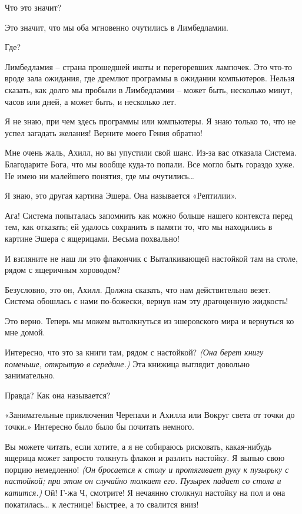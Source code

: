 \documentclass[../main.tex]{subfiles}
\begin{document}
\begin{Dialogue}
\begin{sublevel}
\begin{sublevel}
 Что это значит?

 Это значит, что мы оба мгновенно очутились в Лимбедламии.

 Где?

 Лимбедламия \--- страна прошедшей икоты и перегоревших лампочек. Это что-то вроде зала ожидания, где дремлют программы в ожидании компьютеров. Нельзя сказать, как долго мы пробыли в Лимбедламии \--- может быть, несколько минут, часов или дней, а может быть, и несколько лет.

 Я не знаю, при чем здесь программы или компьютеры. Я знаю только то, что не успел загадать желания! Верните моего Гения обратно!

 Мне очень жаль, Ахилл, но вы упустили свой шанс. Из-за вас отказала Система. Благодарите Бога, что мы вообще куда-то попали. Все могло быть гораздо хуже. Не имею ни малейшего понятия, где мы очутились\ldots{}

 Я знаю, это другая картина Эшера. Она называется «Рептилии».

 Ага! Система попыталась запомнить как можно больше нашего контекста перед тем, как отказать; ей удалось сохранить в памяти то, что мы находились в картине Эшера с ящерицами. Весьма похвально!


 И взгляните не наш ли это флакончик с Выталкивающей настойкой там на столе, рядом с ящеричным хороводом?

 Безусловно, это он, Ахилл. Должна сказать, что нам действительно везет. Система обошлась с нами по-божески, вернув нам эту драгоценную жидкость!

 Это верно. Теперь мы можем вытолкнуться из эшеровского мира и вернуться ко мне домой.

 Интересно, что это за книги там, рядом с настойкой? \emph{(Она берет книгу поменьше, открытую в середине.)} Эта книжица выглядит довольно занимательно.

 Правда? Как она называется?

 «Занимательные приключения Черепахи и Ахилла или Вокруг света от точки до точки.» Интересно было было бы почитать немного.

 Вы можете читать, если хотите, а я не собираюсь рисковать, какая-нибудь ящерица может запросто толкнуть флакон и разлить настойку. Я выпью свою порцию немедленно! \emph{(Он бросается к столу и протягивает руку к пузырьку с настойкой; при этом он случайно толкает его. Пузырек падает со стола и катится.)} Ой! Г-жа Ч, смотрите! Я нечаянно столкнул настойку на пол и она покатилась\ldots{} к лестнице! Быстрее, а то свалится вниз!


\end{sublevel}
\end{sublevel}
\end{Dialogue}
\end{document}
